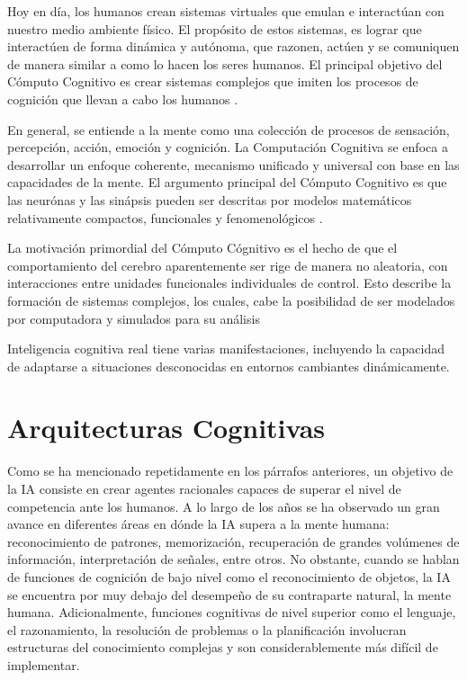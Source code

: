 Hoy en día, los humanos crean sistemas virtuales que emulan e interact\'{u}an con nuestro medio ambiente físico. El prop\'{o}sito de estos sistemas, es lograr que interact\'{u}en de forma din\'{a}mica y aut\'{o}noma, que razonen, act\'{u}en y se comuniquen de manera similar a como lo hacen los seres humanos. El principal objetivo del C\'{o}mputo Cognitivo es crear sistemas complejos que imiten los procesos de cognici\'{o}n que llevan a cabo los humanos \cite{crowder2014artificial}.

En general, se entiende a la mente como una colección de procesos de sensaci\'{o}n, percepci\'{o}n, acci\'{o}n, emoci\'{o}n y cognici\'{o}n. La Computaci\'{o}n Cognitiva se enfoca a desarrollar un enfoque coherente, mecanismo unificado y universal con base en las capacidades de la mente. El argumento principal del C\'{o}mputo Cognitivo es que las neur\'{o}nas y las sin\'{a}psis pueden ser descritas por modelos matem\'{a}ticos relativamente compactos, funcionales y fenomenol\'{o}gicos \cite{cc}.

La motivación primordial del C\'{o}mputo C\'{ognitivo} es el hecho de que el comportamiento
del cerebro aparentemente ser rige de manera no aleatoria, con interacciones entre unidades funcionales individuales de control. Esto describe la formaci\'{o}n de sistemas complejos, los cuales, cabe la posibilidad de ser modelados por computadora y simulados para su an\'{a}lisis \cite{cc}

Inteligencia cognitiva real tiene varias manifestaciones, incluyendo la capacidad de adaptarse a situaciones desconocidas en entornos cambiantes din\'{a}micamente.
\section{Arquitecturas Cognitivas}

Como se ha mencionado repetidamente en los p\'{a}rrafos anteriores, un objetivo de la IA consiste en crear agentes racionales capaces de superar el nivel de competencia ante los humanos. A lo largo de los a\~nos se ha observado un gran avance en diferentes \'{a}reas en d\'{o}nde la IA supera a la mente humana: reconocimiento de patrones, memorizaci\'{o}n, recuperaci\'{o}n de grandes vol\'{u}menes de informaci\'{o}n, interpretaci\'{o}n de se\~nales, entre otros. No obstante, cuando se hablan de funciones de cognici\'{o}n de bajo nivel como el reconocimiento de objetos, la IA se encuentra por muy debajo del desempe\~no de su contraparte natural, la mente humana. Adicionalmente, funciones cognitivas de nivel superior como el lenguaje, el razonamiento, la resoluci\'{o}n de problemas o la planificaci\'{o}n involucran estructuras del conocimiento complejas y son considerablemente m\'{a}s dif\'{i}cil de implementar. 


